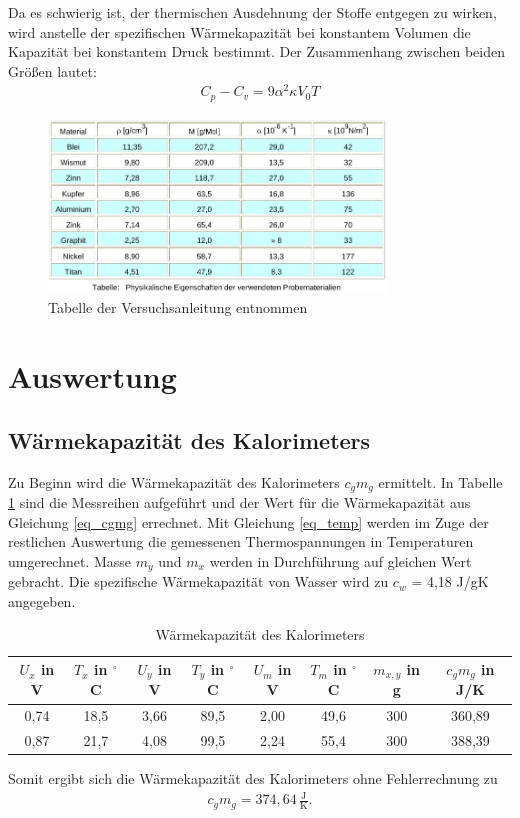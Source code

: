 Da es schwierig ist, der thermischen Ausdehnung der Stoffe entgegen zu wirken, wird anstelle der spezifischen Wärmekapazität bei konstantem Volumen die Kapazität bei konstantem Druck bestimmt. Der Zusammenhang zwischen beiden Größen lautet:
\begin{align}
C_p - C_v = 9 \alpha^2 \kappa V_0 T
\end{align}
\begin{figure}[h]
\includegraphics[width=0.8\textwidth]{pics/litwerte.jpg}
\caption{Tabelle der Versuchsanleitung entnommen}
\label{pic_const}
\end{figure}


\section{Auswertung}
\subsection{Wärmekapazität des Kalorimeters}
\label{sec_kalorimeter}
Zu Beginn wird die Wärmekapazität des Kalorimeters $c_g m_g$ ermittelt. In Tabelle \ref{tab_cgmg} sind die Messreihen aufgeführt und der
Wert für die Wärmekapazität aus Gleichung \eqref{eq_cgmg} errechnet. Mit Gleichung \eqref{eq_temp} werden im Zuge der restlichen 
Auswertung die gemessenen Thermospannungen in Temperaturen umgerechnet. Masse $m_y$ und $m_x$ werden in Durchführung auf gleichen Wert
gebracht. Die spezifische Wärmekapazität von Wasser wird zu $c_w$ = 4,18 J/gK angegeben.
\begin{table}[H]
 \begin{tabular}{c|c|c|c|c|c|c|c}
 $U_x$ in V & $T_x$ in $^\circ$C & $U_y$ in V & $T_y$ in $^\circ$C & $U_m$ in V & $T_m$ in $^\circ$C & $m_{x,y}$ in g & $c_g m_g$ in J/K\\
 \hline
0,74&	18,5&	3,66&	89,5&	2,00&	49,6&	300&	360,89\\
0,87&	21,7&	4,08&	99,5&	2,24&	55,4&	300&	388,39\\
 \end{tabular}
\caption{Wärmekapazität des Kalorimeters}
\label{tab_cgmg}
\end{table}
Somit ergibt sich die Wärmekapazität des Kalorimeters ohne Fehlerrechnung zu 
\begin{align}
c_g m_g = 374,64 \, \frac{\text{J}}{\text{K}}.
\end{align}

